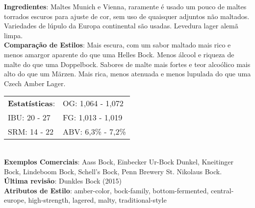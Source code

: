 \textbf{Ingredientes}: Maltes Munich e Vienna, raramente é usado um pouco de maltes torrados escuros para ajuste de cor, sem uso de quaisquer adjuntos não maltados. Variedades de lúpulo da Europa continental são usadas. Levedura lager alemã limpa. \\
\textbf{Comparação de Estilos}: Mais escura, com um sabor maltado mais rico e menos amargor aparente do que uma Helles Bock. Menos álcool e riqueza de malte do que uma Doppelbock. Sabores de malte mais fortes e teor alcoólico mais alto do que um Märzen. Mais rica, menos atenuada e menos lupulada do que uma Czech Amber Lager. \\
\begin{tabular}{@{}p{35mm}p{35mm}@{}}
  \textbf{Estatísticas}: & OG: 1,064 - 1,072 \\
  IBU: 20 - 27 & FG: 1,013 - 1,019 \\
  SRM: 14 - 22 & ABV: 6,3\% - 7,2\%
\end{tabular}\\
\textbf{Exemplos Comerciais}: Aass Bock, Einbecker Ur-Bock Dunkel, Kneitinger Bock, Lindeboom Bock, Schell’s Bock, Penn Brewery St. Nikolaus Bock. \\
\textbf{Última revisão}: Dunkles Bock (2015) \\
\textbf{Atributos de Estilo}: amber-color, bock-family, bottom-fermented, central-europe, high-strength, lagered, malty, traditional-style
